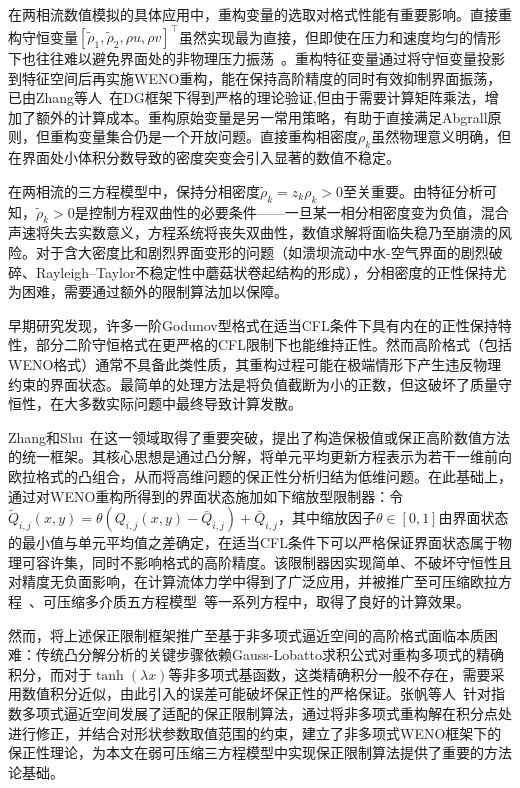 \documentclass[12pt,a4paper]{article}
\numberwithin{equation}{section}    %
\begin{document}
在两相流数值模拟的具体应用中，重构变量的选取对格式性能有重要影响。直接重构守恒变量$[\tilde{\rho}_1, \tilde{\rho}_2, \rho u, \rho v]^\top$虽然实现最为直接，但即使在压力和速度均匀的情形下也往往难以避免界面处的非物理压力振荡~\cite{li2020finite,coralic2014finite}。重构特征变量通过将守恒变量投影到特征空间后再实施WENO重构，能在保持高阶精度的同时有效抑制界面振荡，已由Zhang等人~\cite{zhang2023physical}在DG框架下得到严格的理论验证,但由于需要计算矩阵乘法，增加了额外的计算成本。重构原始变量是另一常用策略，有助于直接满足Abgrall原则，但重构变量集合仍是一个开放问题。直接重构相密度$\rho_k$虽然物理意义明确，但在界面处小体积分数导致的密度突变会引入显著的数值不稳定。


在两相流的三方程模型中，保持分相密度$\tilde{\rho}_k = z_k \rho_k > 0$至关重要。由特征分析可知，$\tilde{\rho}_k > 0$是控制方程双曲性的必要条件——一旦某一相分相密度变为负值，混合声速将失去实数意义，方程系统将丧失双曲性，数值求解将面临失稳乃至崩溃的风险。对于含大密度比和剧烈界面变形的问题（如溃坝流动中水-空气界面的剧烈破碎、Rayleigh--Taylor不稳定性中蘑菇状卷起结构的形成），分相密度的正性保持尤为困难，需要通过额外的限制算法加以保障。

早期研究发现，许多一阶Godunov型格式在适当CFL条件下具有内在的正性保持特性，部分二阶守恒格式在更严格的CFL限制下也能维持正性。然而高阶格式（包括WENO格式）通常不具备此类性质，其重构过程可能在极端情形下产生违反物理约束的界面状态。最简单的处理方法是将负值截断为小的正数，但这破坏了质量守恒性，在大多数实际问题中最终导致计算发散。

Zhang和Shu~\cite{zhang2011maximum}在这一领域取得了重要突破，提出了构造保极值或保正高阶数值方法的统一框架。其核心思想是通过凸分解，将单元平均更新方程表示为若干一维前向欧拉格式的凸组合，从而将高维问题的保正性分析归结为低维问题。在此基础上，通过对WENO重构所得到的界面状态施加如下缩放型限制器：令$\tilde{Q}_{i,j}(x,y) = \theta(Q_{i,j}(x,y) - \bar{Q}_{i,j}) + \bar{Q}_{i,j}$，其中缩放因子$\theta \in [0,1]$由界面状态的最小值与单元平均值之差确定，在适当CFL条件下可以严格保证界面状态属于物理可容许集，同时不影响格式的高阶精度。该限制器因实现简单、不破坏守恒性且对精度无负面影响，在计算流体力学中得到了广泛应用，并被推广至可压缩欧拉方程~\cite{zhang2011positivity}、可压缩多介质五方程模型~\cite{Zhang2025exponential}等一系列方程中，取得了良好的计算效果。

然而，将上述保正限制框架推广至基于非多项式逼近空间的高阶格式面临本质困难：传统凸分解分析的关键步骤依赖Gauss-Lobatto求积公式对重构多项式的精确积分，而对于$\tanh(\lambda x)$等非多项式基函数，这类精确积分一般不存在，需要采用数值积分近似，由此引入的误差可能破坏保正性的严格保证。张帆等人~\cite{Zhang2025exponential}针对指数多项式逼近空间发展了适配的保正限制算法，通过将非多项式重构解在积分点处进行修正，并结合对形状参数取值范围的约束，建立了非多项式WENO框架下的保正性理论，为本文在弱可压缩三方程模型中实现保正限制算法提供了重要的方法论基础。
\end{document}
